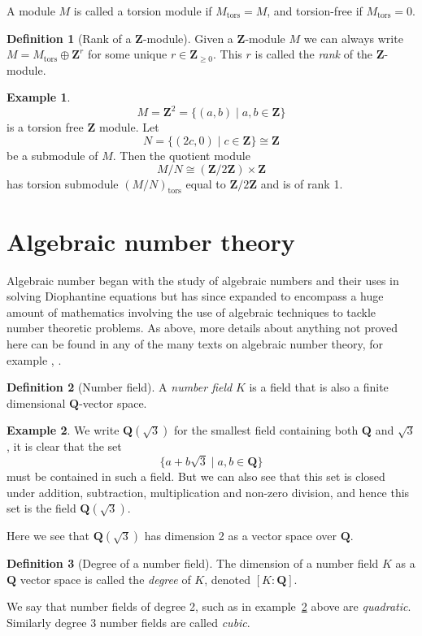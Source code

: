 \documentclass[a4paper,abstracton,bibtotoc]{scrreprt}
\theoremstyle{definition}
\newtheorem{defn}{Definition}
\newtheorem{ex}{Example}
\newcommand{\QQ}{\mathbf{Q}}
\newcommand{\ZZ}{\mathbf{Z}}
\begin{document}
A module $M$ is called a torsion module if $M_\text{tors} = M$, and torsion-free if $M_\text{tors} = 0$.


\begin{defn}[Rank of a $\ZZ$-module]
Given a $\ZZ$-module $M$ we can always write $M = M_\text{tors} \oplus \ZZ^r$ for some unique $r\in \ZZ_{\ge 0}$.
This $r$ is called the \emph{rank} of the $\ZZ$-module.
\end{defn}

\begin{ex}
\[M = \ZZ^2 = \{(a,b)\mid a,b\in \ZZ\}\]
is a torsion free $\ZZ$ module. Let
\[N = \{(2c,0) \mid c\in\ZZ\} \cong \ZZ\]
be a submodule of $M$.
Then the quotient module
\[M/N \cong (\ZZ/2\ZZ)\times \ZZ\]
has torsion submodule $(M/N)_\text{tors}$ equal to $\ZZ/2\ZZ$ and is of rank 1.
\end{ex}

\section{Algebraic number theory}
\label{sec:ant}

Algebraic number began with the study of algebraic numbers and their uses in solving Diophantine equations but has since expanded to encompass a huge amount of mathematics involving the use of algebraic techniques to tackle number theoretic problems. %
As above, more details about anything not proved here can be found in any of the many texts on algebraic number theory, for example \cite{neukirch}, \cite{lang}.

\begin{defn}[Number field]
A \emph{number field} $K$ is a field that is also a finite dimensional $\QQ$-vector space.
\end{defn}

\begin{ex}\label{ex:quad}
We write $\QQ(\sqrt{3})$ for the smallest field containing both $\QQ$ and $\sqrt{3}$, it is clear that the set
\[
\{a + b\sqrt{3}\mid a,b \in \QQ\}
\]
must be contained in such a field.
But we can also see that this set is closed under addition, subtraction, multiplication and non-zero division, and hence this set is the field $\QQ(\sqrt{3})$.

Here we see that $\QQ(\sqrt{3})$ has dimension 2 as a vector space over $\QQ$.
\end{ex}

\begin{defn}[Degree of a number field]
The dimension of a number field $K$ as a $\QQ$ vector space is called the \emph{degree} of $K$, denoted $[K:\QQ]$.

We say that number fields of degree 2, such as in example~\ref{ex:quad} above are \emph{quadratic}.
Similarly degree 3 number fields are called \emph{cubic}.
\end{defn}
\end{document}
